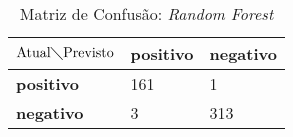 \begin{table}[h!]
\centering
\caption{Matriz de Confusão: \textit{Random Forest}}
\label{tab:mc-rf}
\begin{tabular}{|l|l|l|}
\hline
$\textrm{Atual}\diagdown\textrm{Previsto}$ & \textbf{positivo} & \textbf{negativo} \\ \hline
\textbf{positivo}     & 161                 & 1   \\ \hline
\textbf{negativo}     & 3                   & 313 \\ \hline
\end{tabular}
\end{table}